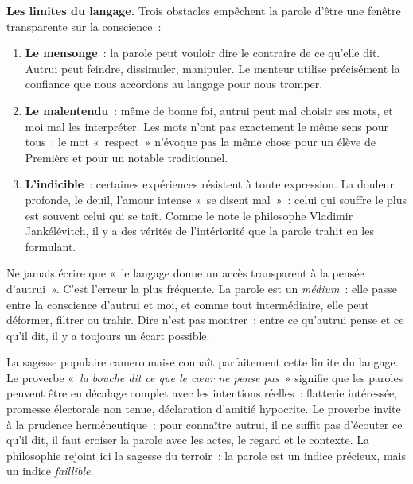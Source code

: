 \documentclass[11pt]{article}
\begin{document}
\textbf{Les limites du langage.} Trois obstacles emp\^echent la parole d'\^etre une fen\^etre transparente sur la conscience~:
\begin{enumerate}
\item \textbf{Le mensonge}~: la parole peut vouloir dire le contraire de ce qu'elle dit. Autrui peut feindre, dissimuler, manipuler. Le menteur utilise pr\'ecis\'ement la confiance que nous accordons au langage pour nous tromper.
\item \textbf{Le malentendu}~: m\^eme de bonne foi, autrui peut mal choisir ses mots, et moi mal les interpr\'eter. Les mots n'ont pas exactement le m\^eme sens pour tous~: le mot «~respect~» n'\'evoque pas la m\^eme chose pour un \'el\`eve de Premi\`ere et pour un notable traditionnel.
\item \textbf{L'indicible}~: certaines exp\'eriences r\'esistent \`a toute expression. La douleur profonde, le deuil, l'amour intense «~se disent mal~»~: celui qui souffre le plus est souvent celui qui se tait. Comme le note le philosophe Vladimir Jank\'el\'evitch, il y a des v\'erit\'es de l'int\'eriorit\'e que la parole trahit en les formulant.
\end{enumerate}

\begin{attention}
Ne jamais \'ecrire que «~le langage donne un acc\`es transparent \`a la pens\'ee d'autrui~». C'est l'erreur la plus fr\'equente. La parole est un \emph{m\'edium}~: elle passe entre la conscience d'autrui et moi, et comme tout interm\'ediaire, elle peut d\'eformer, filtrer ou trahir. Dire n'est pas montrer~: entre ce qu'autrui pense et ce qu'il dit, il y a toujours un \'ecart possible.
\end{attention}

\begin{exemplebox}
La sagesse populaire camerounaise conna\^it parfaitement cette limite du langage. Le proverbe «~\emph{la bouche dit ce que le c\oe ur ne pense pas}~» signifie que les paroles peuvent \^etre en d\'ecalage complet avec les intentions r\'eelles~: flatterie int\'eress\'ee, promesse \'electorale non tenue, d\'eclaration d'amiti\'e hypocrite. Le proverbe invite \`a la prudence herméneutique~: pour conna\^itre autrui, il ne suffit pas d'\'ecouter ce qu'il dit, il faut croiser la parole avec les actes, le regard et le contexte. La philosophie rejoint ici la sagesse du terroir~: la parole est un indice pr\'ecieux, mais un indice \emph{faillible}.
\end{exemplebox}
\end{document}
